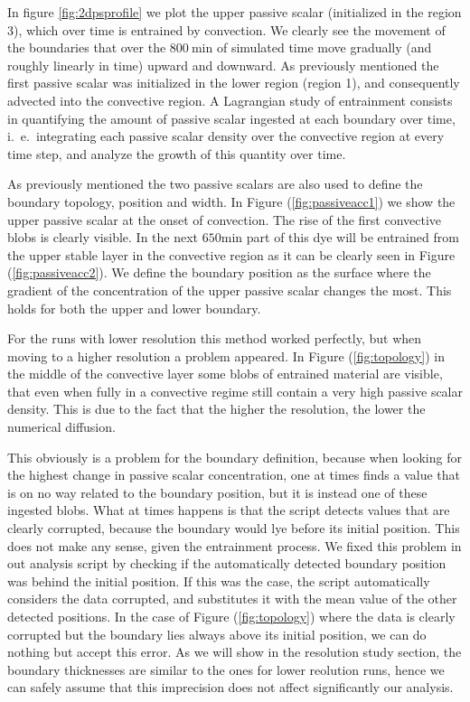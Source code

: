 In figure \ref{fig:2dpsprofile} we plot the upper passive scalar (initialized in the region 3), which over time is entrained by convection. We clearly see the movement of the boundaries that over the $800 \ \mathrm{min}$ of simulated time move gradually (and roughly linearly in time) upward and downward. As previously mentioned the first passive scalar was initialized in the lower region (region 1), and consequently advected into the convective region. A Lagrangian study of entrainment consists in quantifying the amount of passive scalar ingested at each boundary over time, i.\ e.\ integrating each passive scalar density over the convective region at every time step, and analyze the growth of this quantity over time.

As previously mentioned the two passive scalars are also used to define the boundary topology, position and width. In Figure (\ref{fig:passiveacc1}) we show the upper passive scalar at the onset of convection. The rise of the first convective blobs is clearly visible. In the next $650 \mathrm{min}$ part of this dye will be entrained from the upper stable layer in the convective region as it can be clearly seen in Figure (\ref{fig:passiveacc2}). We define the boundary position as the surface where the gradient of the concentration of the upper passive scalar changes the most. This holds for both the upper and lower boundary.
  
For the runs with lower resolution this method worked perfectly, but when moving to a higher resolution a problem appeared. In Figure (\ref{fig:topology})  in the middle of the convective layer some blobs of entrained material are visible, that even when fully in a convective regime still contain a very high passive scalar density. This is due to the fact that the higher the resolution, the lower the numerical diffusion.
  
This obviously is a problem for the boundary definition, because when looking for the highest change in passive scalar concentration, one at times finds a value that is on no way related to the boundary position, but it is instead one of these ingested blobs. What at times happens is that the script detects values that are clearly corrupted, because the boundary would lye before its initial position. This does not make any sense, given the entrainment process. We fixed this problem in out analysis script by checking if the automatically detected boundary position was behind the initial position. If this was the case, the script automatically considers the data corrupted, and substitutes it with the mean value of the other detected positions. In the case of Figure (\ref{fig:topology}) where the data is clearly corrupted but the boundary lies always above its initial position, we can do nothing but accept this error. As we will show in the resolution study section, the boundary thicknesses are similar to the ones for lower reolution runs, hence we can safely assume that this imprecision does not affect significantly our analysis. 

